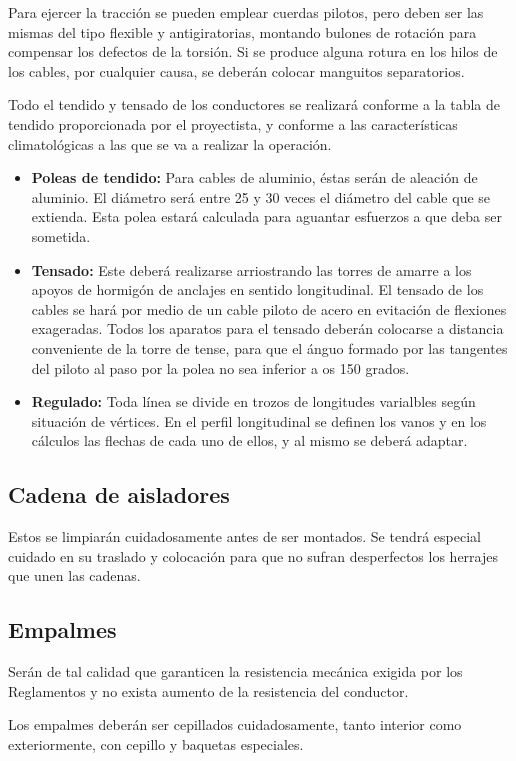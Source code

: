 Para ejercer la tracción se pueden emplear cuerdas pilotos, pero deben ser las mismas del tipo flexible y antigiratorias, montando bulones de rotación para compensar los defectos de la torsión. Si se produce alguna rotura en los hilos de los cables, por cualquier causa, se deberán colocar manguitos separatorios.
	
Todo el tendido y tensado de los conductores se realizará conforme a la tabla de tendido proporcionada por el proyectista, y conforme a las características climatológicas a las que se va a realizar la operación.
\begin{itemize}
    \item \textbf{Poleas de tendido:} Para cables de aluminio, éstas serán de aleación de aluminio. El diámetro será entre 25 y 30 veces el diámetro del cable que se extienda. Esta polea estará calculada para aguantar esfuerzos a que deba ser sometida.
    \item \textbf{Tensado:} Este deberá realizarse arriostrando las torres de amarre a los apoyos de hormigón de anclajes en sentido longitudinal. El tensado de los cables se hará por medio de un cable piloto de acero en evitación de flexiones exageradas. Todos los aparatos para el tensado deberán colocarse a distancia conveniente de la torre de tense, para que el ánguo formado por las tangentes del piloto al paso por la polea no sea inferior a os 150 grados.
    \item \textbf{Regulado:} Toda línea se divide en trozos de longitudes varialbles según situación de vértices. En el perfil longitudinal se definen los vanos y en los cálculos las flechas de cada uno de ellos, y al mismo se deberá adaptar.
\end{itemize}
\subsection{Cadena de aisladores}
\label{subsec:pliego-aislCT}
Estos se limpiarán cuidadosamente antes de ser montados. Se tendrá especial cuidado en su traslado y colocación para que no sufran desperfectos los herrajes que unen las cadenas.
\subsection{Empalmes}
\label{subsec:pliego-empalmesCT}
Serán de tal calidad que garanticen la resistencia mecánica exigida por los Reglamentos y no exista aumento de la resistencia del conductor.

Los empalmes deberán ser cepillados cuidadosamente, tanto interior como exteriormente, con cepillo y baquetas especiales.
